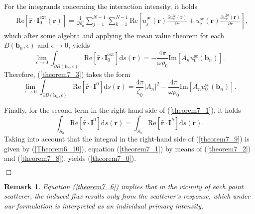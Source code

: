 \documentclass{article}
\newtheorem{remark}{Remark}
\begin{document}
For the integrands concerning the interaction intensity, it holds
%
\begin{align}
\label{theorem7_32}
&\mathrm{Re}\left[\hat{\mathbf{r}}\cdot\mathbf{I}_0^{\mathrm{ext}}(\mathbf{r})\right]=\frac{\mathrm{i}}{\omega\rho_0}\sum_{j=1}^{N-1}\sum_{k=1}^{N-1}\mathrm{Re}\left[u_j^{\mathrm{pr}}(\mathbf{r})\frac{\partial\overline{u_k^{\mathrm{sc}}}(\mathbf{r})}{\partial r}+u_j^{\mathrm{sc}}(\mathbf{r})\frac{\partial\overline{u_k^{\mathrm{pr}}}(\mathbf{r})}{\partial r}\right],
\end{align}
%
which after some algebra and applying the mean value theorem for each $B(\mathbf{b}_n,\epsilon)$ and $\epsilon\rightarrow0$, yields 
%
\begin{equation}
\label{theorem7_7}
\lim_{\epsilon\rightarrow0}\int_{\partial B(\mathbf{b}_n,\epsilon)}\mathrm{Re}\left[\hat{\mathbf{r}}\cdot\mathbf{I}_0^{\mathrm{ext}}\right]\mathrm{d}s(\mathbf{r})=-\frac{4\pi}{\omega\rho_0}\mathrm{Im}\left[\overline{A_n}u_0^{\mathrm{sc}}(\mathbf{b}_n)\right].
\end{equation}
%
Therefore, (\ref{theorem7_3}) takes the form
\begin{equation}
\label{theorem7_8}
\lim_{\epsilon\rightarrow0}\int_{\partial B(\mathbf{b}_n,\epsilon)}\mathrm{Re}\left[\hat{\mathbf{r}}\cdot\mathbf{I}^0\right]\mathrm{d}s(\mathbf{r})=\frac{4\pi}{\zeta_0}\lvert A_n\rvert^2-\frac{4\pi}{\omega\rho_0}\mathrm{Im}\left[\overline{A_n}u_0^{\mathrm{sc}}(\mathbf{b}_n)\right].
\end{equation}
%

Finally, for the second term in the right-hand side of (\ref{theorem7_1}), it holds
%
\begin{equation}
\label{theorem7_9}
\int_{S_h}\mathrm{Re}\left[\hat{\mathbf{r}}\cdot\mathbf{I}^0\right]\mathrm{d}s(\mathbf{r})=\int_{S_h}\mathrm{Re}\left[\hat{\mathbf{r}}\cdot\mathbf{I}^h\right]\mathrm{d}s(\mathbf{r}).
\end{equation}
%
Taking into account that the integral in the right-hand side of (\ref{theorem7_9}) is given by (\ref{Theorem6_10}), equation (\ref{theorem7_1}) by means of (\ref{theorem7_2}) and (\ref{theorem7_8}), yields (\ref{theorem7_0}). 
%
\begin{flushright}$\Box$\end{flushright}

\begin{remark}
Equation (\ref{theorem7_6}) implies that in the vicinity of each point scatterer, the induced flux results only from the scatterer's response, which under our formulation is interpreted as an individual primary intensity.
\end{remark}
\end{document}
